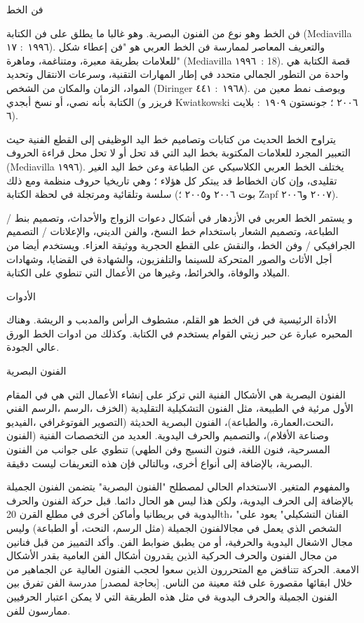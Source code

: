 \documentclass[a4paper]{article}
\begin{document}
فن الخط

فن الخط وهو نوع من الفنون البصرية. وهو غالبا ما يطلق على فن الكتابة (Mediavilla ١٩٩٦ : ١٧). والتعريف المعاصر لممارسة فن الخط العربي هو "فن إعطاء شكل للعلامات بطريقة معبرة، ومتناغمة، وماهرة" (Mediavilla ١٩٩٦ : 18). قصة الكتابة هي واحدة من التطور الجمالي متحدد في إطار المهارات التقنية، وسرعات الانتقال وتحديد المواد، الزمان والمكان من الشخص (Diringer ١٩٦٨ : ٤٤١). ويوصف نمط معين من الكتابة بأنه نصي، أو نسخ أبجدي (فريزر و Kwiatkowski ٢٠٠٦ ؛ جونستون ١٩٠٩ : بلايت ٦).

يتراوح الخط الحديث من كتابات وتصاميم خط اليد الوظيفى إلى القطع الفنية حيث التعبير المجرد للعلامات المكتوبة بخط اليد التي قد تحل أو لا تحل محل قراءة الحروف (Mediavilla ١٩٩٦). يختلف الخط العربي الكلاسيكي عن الطباعة وعن خط اليد الغير تقليدى، وإن كان الخطاط قد يبتكر كل هؤلاء ؛ وهي تاريخيا حروف منظمة ومع ذلك سلسة وتلقائية ومرتجلة في لحظة الكتابة (بوت ٢٠٠٦ و٢٠٠٥ ؛ Zapf ٢٠٠٧ و٢٠٠٦).

و يستمر الخط العربي في الأزدهار في أشكال دعوات الزواج والأحداث، وتصميم بنط / الطباعة، وتصميم الشعار باستخدام خط النسخ، والفن الديني، والإعلانات / التصميم الجرافيكي / وفن الخط، والنقش على القطع الحجرية ووثيقة العزاء. ويستخدم أيضا من أجل الأثاث والصور المتحركة للسينما والتلفزيون، والشهادة في القضايا، وشهادات الميلاد والوفاة، والخرائط، وغيرها من الأعمال التي تنطوي على الكتابة.


الأدوات

الأداة الرئيسية في فن الخط هو القلم، مشطوف الرأس والمدبب و الريشة. وهناك المحبره عبارة عن حبر زيتي القوام يستخدم في الكتابة. وكذلك من ادوات الخط الورق عالي الجودة.



الفنون البصرية

الفنون البصرية هي الأشكال الفنية التي تركز على إنشاء الأعمال التي هي في المقام الأول مرئية في الطبيعة، مثل الفنون التشكيلية التقليدية (الخزف ،الرسم ،الرسم الفني ،النحت،العمارة، والطباعة)، الفنون البصرية الحديثة (التصوير الفوتوغرافي ،الفيديو وصناعة الأفلام)، والتصميم والحرف اليدوية. العديد من التخصصات الفنية (الفنون المسرحية، فنون اللغة، فنون النسيج وفن الطهي) تنطوي على جوانب من الفنون البصرية، بالإضافة إلى أنواع أخرى، وبالتالي فإن هذه التعريفات ليست دقيقة.

والمفهوم المتغير. الاستخدام الحالي لمصطلح "الفنون البصرية" يتضمن الفنون الجميلة بالإضافة إلى الحرف اليدوية، ولكن هذا ليس هو الحال دائما. قبل حركة الفنون والحرف اليدوية في بريطانيا وأماكن أخرى في مطلع القرن 20th، "الفنان التشكيلي" يعود على الشخص الذي يعمل في مجالالفنون الجميلة (مثل الرسم، النحت، أو الطباعة) وليس مجال الاشغال اليدوية والحرفية، أو من يطبق ضوابط الفن. وأكد التمييز من قبل فنانين من مجال الفنون والحرف الحركية الذين يقدرون أشكال الفن العامية بقدر الأشكال الامعة. الحركة تتناقض مع المتحررون الذين سعوا لحجب الفنون العالية عن الجماهير من خلال ابقائها مقصورة على فئة معينة من الناس. [بحاجة لمصدر] مدرسة الفن تفرق بين الفنون الجميلة والحرف اليدوية في مثل هذه الطريقة التي لا يمكن اعتبار الحرفيين ممارسون للفن.
\end{document}
